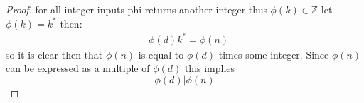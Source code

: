 \documentclass[11pt]{article}
\theoremstyle{definition}  %
\newcommand{\Z}{\mathbb{Z}}
\begin{document}
\begin{enumerate}
\begin{proof}
for all integer inputs phi returns another integer thus $\phi(k)\in \Z$ let $\phi(k)=k^*$ then:
\begin{align}
  &\phi(d)k^*=\phi(n)
\end{align}
so it is clear then that $\phi(n)$ is equal to $\phi(d)$ times some integer. Since $\phi(n)$ can be expressed as a multiple of $\phi(d)$  this implies \[
  \phi(d)|\phi(n)
\]
\end{proof}
 \end{enumerate}
\end{document}
